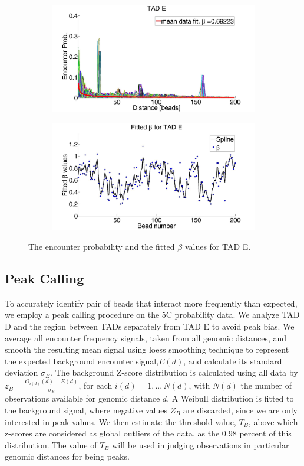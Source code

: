 \documentclass[12pt]{article}
\begin{document}
\begin{figure}[H]
 \begin{subfigure}[b]{0.3\textwidth}
 \includegraphics[scale=0.2]{meanDataFitTADE}
 \caption{}
 \end{subfigure}
 
 \begin{subfigure}[b]{0.3\textwidth}
\includegraphics[scale=0.2]{fittedExpValuesWithSplineAverageTADE}
\caption{}
 \end{subfigure}
\caption{The encounter probability and the fitted $\beta$ values for TAD E.}
\end{figure}
\subsection{Peak Calling}

To accurately identify pair of beads that interact more frequently than expected, we employ a peak calling procedure on the 5C probability data. We analyze TAD D and the region between TADs separately from TAD E to avoid peak bias. We average all encounter frequency signals, taken from all genomic distances, and smooth the resulting mean signal using loess smoothing technique to represent the expected background encounter signal,$E(d)$, and calculate its standard deviation $\sigma_E$. The background Z-score distribution is calculated using all data by $z_B=\frac{O_{i(d)}(d)-E(d)}{\sigma_E}$, for each $i(d)=1,..,N(d)$, with $N(d)$ the number of observations available for genomic distance $d$. A Weibull distribution is fitted to the background signal, where negative values $Z_B$ are discarded, since we are only interested in peak values. We then estimate the threshold value, $T_B$, above which z-scores are considered as global outliers of the data, as the 0.98 percent of this distribution. The value of $T_B$ will be used in judging observations in particular genomic distances for being peaks.
\end{document}
